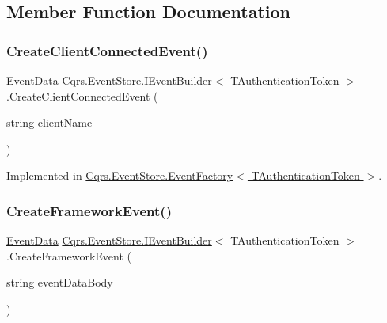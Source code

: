 \subsection{Member Function Documentation}
\mbox{\label{interfaceCqrs_1_1EventStore_1_1IEventBuilder_ae11ead7fa69632041e081e60f51c4e9f_ae11ead7fa69632041e081e60f51c4e9f}} 
\subsubsection{\texorpdfstring{Create\+Client\+Connected\+Event()}{CreateClientConnectedEvent()}}
{\footnotesize\ttfamily \hyperlink{classCqrs_1_1Events_1_1EventData}{Event\+Data} \hyperlink{interfaceCqrs_1_1EventStore_1_1IEventBuilder}{Cqrs.\+Event\+Store.\+I\+Event\+Builder}$<$ T\+Authentication\+Token $>$.Create\+Client\+Connected\+Event (\begin{DoxyParamCaption}\item[{string}]{client\+Name }\end{DoxyParamCaption})}



Implemented in \hyperlink{classCqrs_1_1EventStore_1_1EventFactory_a237daf998b545d170ab9f30187a0b8e7_a237daf998b545d170ab9f30187a0b8e7}{Cqrs.\+Event\+Store.\+Event\+Factory$<$ T\+Authentication\+Token $>$}.

\mbox{\label{interfaceCqrs_1_1EventStore_1_1IEventBuilder_a341d5c54ef8a271a8248e0a5266e6228_a341d5c54ef8a271a8248e0a5266e6228}} 
\subsubsection{\texorpdfstring{Create\+Framework\+Event()}{CreateFrameworkEvent()}\hspace{0.1cm}{\footnotesize\ttfamily [1/4]}}
{\footnotesize\ttfamily \hyperlink{classCqrs_1_1Events_1_1EventData}{Event\+Data} \hyperlink{interfaceCqrs_1_1EventStore_1_1IEventBuilder}{Cqrs.\+Event\+Store.\+I\+Event\+Builder}$<$ T\+Authentication\+Token $>$.Create\+Framework\+Event (\begin{DoxyParamCaption}\item[{string}]{event\+Data\+Body }\end{DoxyParamCaption})}



